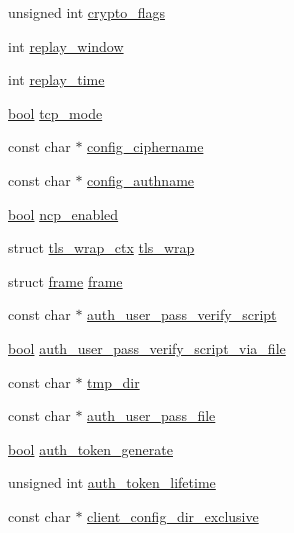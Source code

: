 \begin{DoxyCompactItemize}
unsigned int \hyperlink{structtls__options_a3a022b710a7ebee3df60d348c58cbd20}{crypto\+\_\+flags}
\item 
int \hyperlink{structtls__options_afe554073ee6f5d94c385d43990cc0a0f}{replay\+\_\+window}
\item 
int \hyperlink{structtls__options_a56206642b4f35177969bfbe3ffd86714}{replay\+\_\+time}
\item 
\hyperlink{automatic_8c_abb452686968e48b67397da5f97445f5b}{bool} \hyperlink{structtls__options_aacee137fea1151534baef5463687e283}{tcp\+\_\+mode}
\item 
const char $\ast$ \hyperlink{structtls__options_a961267fe8e3dedb83efee7c83114c641}{config\+\_\+ciphername}
\item 
const char $\ast$ \hyperlink{structtls__options_a2e7b14c6cad7d95b125cba3fc8362ade}{config\+\_\+authname}
\item 
\hyperlink{automatic_8c_abb452686968e48b67397da5f97445f5b}{bool} \hyperlink{structtls__options_ac1a39709cf07e719634a1a6903547414}{ncp\+\_\+enabled}
\item 
struct \hyperlink{structtls__wrap__ctx}{tls\+\_\+wrap\+\_\+ctx} \hyperlink{structtls__options_a339f31e34055b262d5fc4ff59ea08cf5}{tls\+\_\+wrap}
\item 
struct \hyperlink{structframe}{frame} \hyperlink{structtls__options_a5cd706b37fc6ef4c738058cbe63bad78}{frame}
\item 
const char $\ast$ \hyperlink{structtls__options_aeb2cd80ce9217819340aa766eaed9144}{auth\+\_\+user\+\_\+pass\+\_\+verify\+\_\+script}
\item 
\hyperlink{automatic_8c_abb452686968e48b67397da5f97445f5b}{bool} \hyperlink{structtls__options_aba4fa26785baef6cf8f3d2a059c21329}{auth\+\_\+user\+\_\+pass\+\_\+verify\+\_\+script\+\_\+via\+\_\+file}
\item 
const char $\ast$ \hyperlink{structtls__options_a5303f93b3bc97cc9244e09c2b5b6f67a}{tmp\+\_\+dir}
\item 
const char $\ast$ \hyperlink{structtls__options_a40a53a0bdb1e513c6c72f86b5d4d0878}{auth\+\_\+user\+\_\+pass\+\_\+file}
\item 
\hyperlink{automatic_8c_abb452686968e48b67397da5f97445f5b}{bool} \hyperlink{structtls__options_ac372c2391af017e204af37a3e80596b4}{auth\+\_\+token\+\_\+generate}
\item 
unsigned int \hyperlink{structtls__options_a29eb252102c01147ec581ed6195ef810}{auth\+\_\+token\+\_\+lifetime}
\item 
const char $\ast$ \hyperlink{structtls__options_a6c4a92bcce9d3725e64aab48866dff34}{client\+\_\+config\+\_\+dir\+\_\+exclusive}

\end{DoxyCompactItemize}
